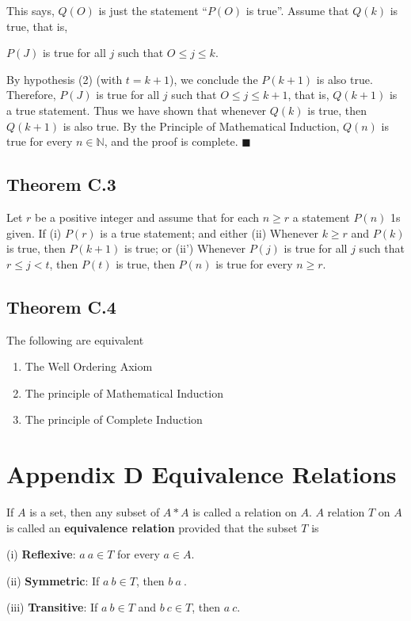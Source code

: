 \documentclass{article}
\begin{document}
This says, $Q(O)$ is just the statement ``$P(O)$ is true''. Assume that $Q(k)$ is
true, that is, 
\begin{center}
    $P(J)$ is true for all $j$ such that $O \leq j \leq k$.
\end{center}

By hypothesis (2) (with $t = k + 1$), we conclude the $P(k + 1)$ is also true.
Therefore, $P(J)$ is true for all $j$ such that $O \leq j \leq k + 1$, that is, $Q(k + 1)$
is a true statement. Thus we have shown that whenever $Q(k)$ is true, then
$Q(k + 1)$ is also true. By the Principle of Mathematical Induction, $Q(n)$
is true for every $n \in \mathbb{N}$, and the proof is complete. $\blacksquare$  

\subsection*{Theorem C.3}

Let $r$ be a positive integer and assume that for each $n \geq r$ a statement $P(n)$
1s given. If
(i) $P(r)$ is a true statement;
and either
(ii) Whenever $k \geq r$ and $P(k)$ is true, then $P(k + 1)$ is true;
or
(ii') Whenever $P(j)$ is true for all $j$ such that $r \leq j < t$, then $P(t)$ is true,
then $P(n)$ is true for every $n \geq r$. 

\subsection*{Theorem C.4}
The following are equivalent
\begin{enumerate}
    \item The Well Ordering Axiom
    \item The principle of Mathematical Induction
    \item The principle of Complete Induction
\end{enumerate}

\section*{Appendix D Equivalence Relations}

If $A$ is a set, then any subset of $A * A$ is called a relation on $A$. $A$ relation $T$ on $A$
is called an \textbf{equivalence relation} provided that the subset $T$ is

(i) \textbf{Reflexive}: $a ~ a \in T$ for every $a \in A$.

(ii) \textbf{Symmetric}: If $a ~ b \in T$, then $b ~ a~$.

(iii) \textbf{Transitive}: If $a ~ b \in T$ and $b ~ c  \in T$, then $a ~ c$. 
\end{document}
